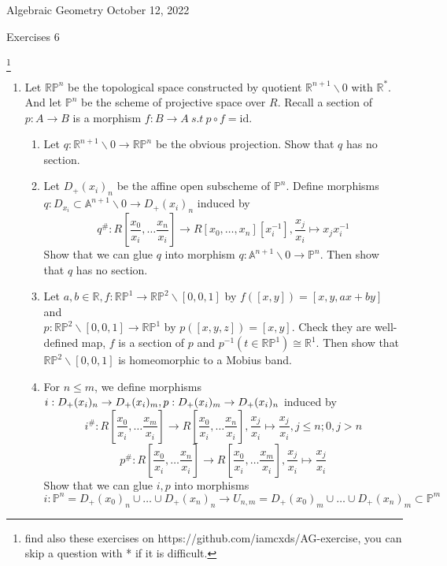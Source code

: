 \documentclass[a4paper,11pt]{article}
\def\bb#1{\mathbb{#1}}
\def\mrm#1{\mathrm{#1}}
\begin{document}
{\small Algebraic Geometry \hfill October 12, 2022 \\}
\begin{center}
\Huge Exercises 6
\end{center}

\vskip0.6cm
\footnote{find also these exercises on https://github.com/iamcxds/AG-exercise, you can skip a question with * if it is difficult.}

\begin{enumerate}[1.]
\item Let $\bb{R}\bb{P}^n$ be the topological space constructed by quotient $\bb{R}^{n+1}\backslash 0$ with $\bb{R}^*$. And let $\bb{P}^n$ be the scheme of projective space over $R$. Recall a section of $p:A\to B$ is a morphism $f:B\to A \ s.t \ p\circ f =\mrm{id}$.
\begin{enumerate}
    \item Let $q:\bb{R}^{n+1}\backslash 0 \to \bb{R}\bb{P}^n$ be the obvious projection. Show that $q$ has no section.
    \item Let $D_+(x_i)_n$ be the affine open subscheme of $\bb{P}^n$. Define  morphisms $q: D_{x_i}\subset \bb{A}^{n+1}\backslash 0 \to D_+(x_i)_n$ induced by 
    \[ q^\#: R[\frac{x_0}{x_i},\ldots \frac{x_n}{x_i}]\to R[x_0,\ldots,x_n][x_i^{-1}],  \frac{x_j}{x_i} \mapsto x_jx_i^{-1}\]
    Show that we can glue $q$ into morphism $q: \bb{A}^{n+1}\backslash 0 \to \bb{P}^n$. Then show that $q$ has no section.
    \item Let $a,b \in \bb{R}, f:\bb{R}\bb{P}^1\to \bb{R}\bb{P}^2\backslash[0,0,1] $ by $f([x,y])=[x,y,ax+by]$ and
    \\ $p:\bb{R}\bb{P}^2\backslash[0,0,1]\to\bb{R}\bb{P}^1$ by $p([x,y,z])=[x,y]$. Check they are well-defined map, $f$ is a section of $p$ and $p^{-1}(t\in \bb{R}\bb{P}^1)\cong \bb{R}^1$. 
    Then show that $\bb{R}\bb{P}^2\backslash[0,0,1]$ is homeomorphic to a Mobius band.
    \item  For $n\leq m$, we define morphisms $i: D_+(x_i)_n\to D_+(x_i)_m, \\p:D_+(x_i)_m\to D_+(x_i)_n$ induced by 
    \[i^\#:R[\frac{x_0}{x_i},\ldots \frac{x_m}{x_i}]\to R[\frac{x_0}{x_i},\ldots \frac{x_n}{x_i}],  \frac{x_j}{x_i} \mapsto \frac{x_j}{x_i}, j\leq n; 0 , j>n \]
    \[p^\#: R[\frac{x_0}{x_i},\ldots \frac{x_n}{x_i}]\to R[\frac{x_0}{x_i},\ldots \frac{x_m}{x_i}],  \frac{x_j}{x_i} \mapsto \frac{x_j}{x_i}\] 
    Show that we can glue $i, p$ into morphisms 
    \[i:\bb{P}^n= D_+(x_0)_n\cup \ldots \cup D_+(x_n)_n \to U_{n,m}= D_+(x_0)_m\cup \ldots  \cup D_+(x_n)_m \subset \bb{P}^m \]

\end{enumerate}
\end{enumerate}
\end{document}

